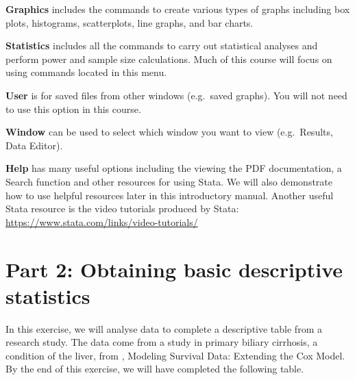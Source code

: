 \documentclass[
]{memoir}
\begin{document}
\textbf{Graphics} includes the commands to create various types of graphs including box plots, histograms, scatterplots, line graphs, and bar charts.

\textbf{Statistics} includes all the commands to carry out statistical analyses and perform power and sample size calculations. Much of this course will focus on using commands located in this menu.

\textbf{User} is for saved files from other windows (e.g.~saved graphs). You will not need to use this option in this course.

\textbf{Window} can be used to select which window you want to view (e.g.~Results, Data Editor).

\textbf{Help} has many useful options including the viewing the PDF documentation, a Search function and other resources for using Stata. We will also demonstrate how to use helpful resources later in this introductory manual. Another useful Stata resource is the video tutorials produced by Stata: \url{https://www.stata.com/links/video-tutorials/}

\hypertarget{part-2-obtaining-basic-descriptive-statistics}{%
\section*{Part 2: Obtaining basic descriptive statistics}\label{part-2-obtaining-basic-descriptive-statistics}}

In this exercise, we will analyse data to complete a descriptive table from a research study. The data come from a study in primary biliary cirrhosis, a condition of the liver, from \citet{therneau_grambsch10}, Modeling Survival Data: Extending the Cox Model. By the end of this exercise, we will have completed the following table.

 
  \providecommand{\huxb}[2]{\arrayrulecolor[RGB]{#1}\global\arrayrulewidth=#2pt}
  \providecommand{\huxvb}[2]{\color[RGB]{#1}\vrule width #2pt}
  \providecommand{\huxtpad}[1]{\rule{0pt}{#1}}
  \providecommand{\huxbpad}[1]{\rule[-#1]{0pt}{#1}}
\end{document}

